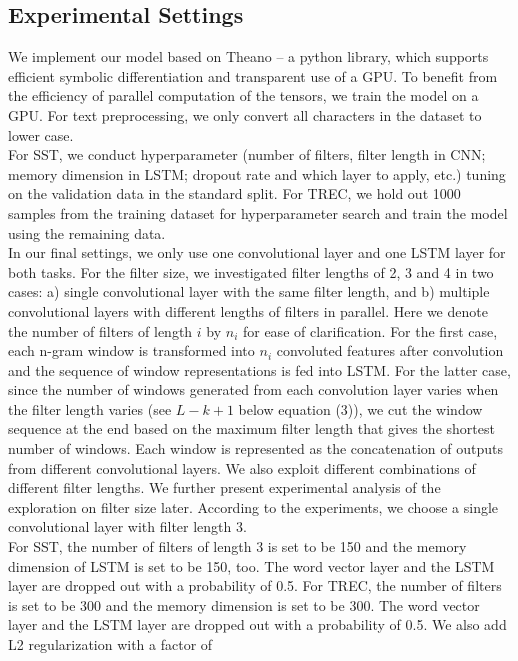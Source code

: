 \documentclass[11pt,letterpaper]{article}
\begin{document}
\subsection{Experimental Settings}
We implement our model based on Theano \cite{theano} -- a python library, which supports efficient symbolic differentiation and transparent use of a GPU. To benefit from the efficiency of parallel computation of the tensors, we train the model on
a GPU. For text preprocessing, we only convert all characters in the
dataset to lower case.\\
\indent For SST, we conduct hyperparameter (number of filters, filter
length in CNN; memory dimension in LSTM; dropout rate and which layer to
apply, etc.) tuning on the validation data in the standard split. For
TREC, we hold out 1000 samples from the training dataset for
hyperparameter search and train the model using the remaining data.\\
\indent In our final settings, we only use one convolutional layer and
one LSTM layer for both tasks. For the filter size, we investigated
filter lengths of 2, 3 and 4 in two cases: a) single convolutional layer
with the same filter length, and b) multiple convolutional layers with
different lengths of filters in parallel. Here we denote the number of
filters of length $i$ by $n_i$ for ease of clarification. For the first
case, each n-gram window is transformed into $n_i$ convoluted features
after convolution and the sequence of window representations is fed into
LSTM. For the latter case, since the number of windows generated from
each convolution layer varies when the filter length varies (see $L-k+1$
below equation (3)), we cut the window sequence at the end based on the
maximum filter length that gives the shortest number of windows. Each
window is represented as the concatenation of outputs from different
convolutional layers. We also exploit different combinations of
different filter lengths. We further present experimental analysis of
the exploration on filter size later. According to the experiments, we
choose a single convolutional layer with filter length 3.\\
\indent For SST, the number of filters of length 3 is set to be 150 and
the memory dimension of LSTM is set to be 150, too. The word vector
layer and the LSTM layer are dropped out with a probability of 0.5. For
TREC, the number of filters is set to be 300 and the memory dimension is
set to be 300. The word vector layer and the LSTM layer are dropped out with
a probability of 0.5. We also add L2 regularization with a factor of
\end{document}
